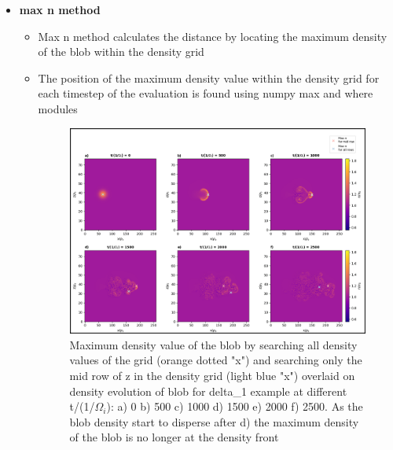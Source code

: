 \documentclass{article}
\begin{document}
\begin{arrowlist}
\begin{itemize}
        \item \textbf{max n method}
            \begin{itemize}
                \item Max n method calculates the distance by locating the maximum density of the blob within the density grid
                \item The position of the maximum density value within the density grid for each timestep of the evaluation is found using numpy max and where modules
    
    \begin{figure}
        \centering
        \includegraphics[width=\textwidth]{./Fig/Fig15 vel max n mid vs all_row hmap t0_t50.png}
        \normalsize{\caption{Maximum density value of the blob by searching all density values of the grid (orange dotted "x") and searching only the mid row of z in the density grid (light blue "x") overlaid on density evolution of blob for delta\_1 example at different t/(1/$\Omega_i$): a) 0 b) 500 c) 1000 d) 1500 e) 2000 f) 2500. As the blob density start to disperse after d) the maximum density of the blob is no longer at the density front}
        \label{fig:fig15}}
    \end{figure}


\end{itemize}
\end{itemize}
\end{arrowlist}
\end{document}
